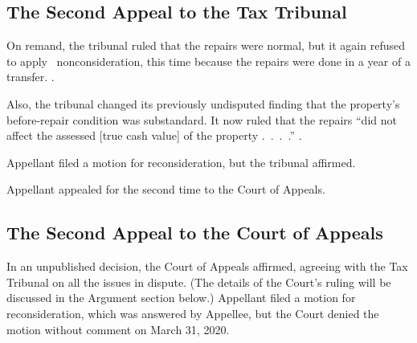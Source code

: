 \documentclass[12pt,\documentclassflag]{michiganCourtOfAppealsBrief}
\begin{document}



\subsection{The Second Appeal to the Tax Tribunal}

On remand, the tribunal ruled that the repairs were normal, but it again refused to apply \mathieuGast\ nonconsideration, this time because
the repairs were done in a year of a transfer. .

Also, the tribunal changed its previously undisputed finding that the property's before-repair condition was substandard. It now ruled that the repairs ``did not affect the assessed [true cash value] of the property .~.~.~.'' .

Appellant filed a motion for reconsideration, but the tribunal affirmed.

Appellant appealed for the second time to the Court of Appeals.

\subsection{The Second Appeal to the Court of Appeals}

In an unpublished decision, the Court of Appeals affirmed, agreeing with the Tax Tribunal on all the issues in dispute. (The details of the Court's ruling will be discussed in the Argument section below.) Appellant filed a motion for reconsideration, which was answered by Appellee, but the Court denied the motion without comment on March 31, 2020.
\end{document}
